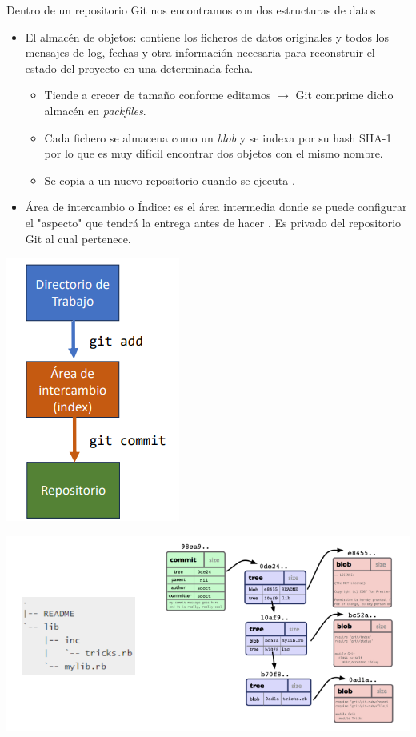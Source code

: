\begin{minipage}{0.5\textwidth}
	Dentro de un repositorio Git nos encontramos con dos estructuras de datos
\begin{itemize}
	\item El almacén de objetos: contiene los ficheros de datos originales y todos los mensajes de log, fechas y otra información necesaria para reconstruir el estado del proyecto en una determinada fecha.
\begin{itemize}
	\item Tiende a crecer de tamaño conforme editamos $\longrightarrow$ Git comprime dicho almacén en \textit{packfiles}.
\item Cada fichero se almacena como un \textit{blob} y se indexa por su hash SHA-1 por lo que es muy difícil encontrar dos objetos con el mismo nombre.
\item Se copia a un nuevo repositorio cuando se ejecuta .
\end{itemize}
\item Área de intercambio o Índice: es el área intermedia donde se puede configurar el "aspecto" que tendrá la entrega antes de hacer . Es privado del repositorio Git al cual
pertenece.
\end{itemize}
\end{minipage}\qquad\begin{minipage}{0.45\textwidth}
\begin{center}
	\includegraphics{"Temas/Tema 1/screenshot008"}
\end{center}
\end{minipage}
\begin{center}
	\includegraphics{"Temas/Tema 1/screenshot009"}
\end{center}
